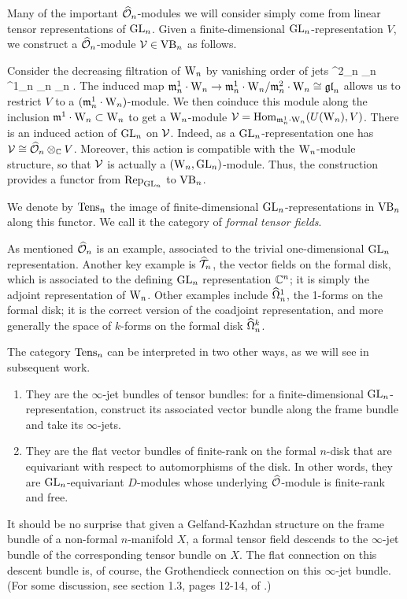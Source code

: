 Many of the important $\widehat{\mathcal O}_n$-modules we will consider simply come from linear tensor representations of ${\rm GL}_n$. 
Given a finite-dimensional ${\rm GL}_n$-representation $V$, we construct a $\widehat{\mathcal O}_n$-module $\mathcal{V} \in {\rm VB}_n$ as follows. 

Consider the decreasing filtration of ${{\rm W}_n}$ by vanishing order of jets 
\ben
\cdots \subset \fm^{2}_n _{n} \subset \fm^1_n _n _n .
\een 
The induced map ${\mathfrak m}_n^1 \cdot {{\rm W}_n} \to {\mathfrak m}_n^1 \cdot {{\rm W}_n} / {\mathfrak m}_n^2
\cdot {{\rm W}_n} \cong {\mathfrak{gl}}_n$ allows us to restrict $V$ to a $({\mathfrak m}_n^1 \cdot
{{\rm W}_n})$-module. 
We  then coinduce this module along the inclusion ${\mathfrak m}^1 \cdot {{\rm W}_n}
\subset {{\rm W}_n}$ to get a ${{\rm W}_n}$-module $\mathcal{V} = {\rm Hom}_{{\mathfrak m}_n^1 \cdot {{\rm W}_n}}(U({{\rm W}_n}),V)$. 
There is an induced action of ${\rm GL}_n$ on $\mathcal{V}$. Indeed, as a ${\rm GL}_n$-representation one has $\mathcal{V} \cong \widehat{\mathcal O}_n \otimes_{\mathbb C} V$.
Moreover, this action is compatible with the ${{\rm W}_n}$-module structure, so that $\mathcal{V}$ is actually a $({{\rm W}_n}, {\rm GL}_n)$-module. 
Thus, the construction provides a functor  from ${\rm Rep}_{{\rm GL}_n}$ to
${\rm VB}_n$.

\begin{dfn} 
We denote by ${\rm Tens}_n$ the image of finite-dimensional ${\rm GL}_n$-representations in ${\rm VB}_n$ along this functor. 
We call it the category of {\em formal tensor fields}.
\end{dfn}

As mentioned $\widehat{\mathcal O}_n$ is an example, associated to the trivial one-dimensional ${\rm GL}_n$ representation.
Another key example is $\widehat{\mathcal T}_n$, the vector fields on the formal disk, which is associated to the defining ${\rm GL}_n$ representation $\mathbb C^n$; 
it is simply the adjoint representation of ${{\rm W}_n}$.
Other examples include $\widehat{\Omega}^1_n$, the 1-forms on the formal disk; it
is the correct version of the coadjoint representation, and more
generally the space of $k$-forms on the formal disk $\widehat{\Omega}^k_n$. 

The category ${\rm Tens}_n$ can be interpreted in two other ways, as we will see in subsequent work.
\begin{enumerate}
\item They are the $\infty$-jet bundles of tensor bundles: for a finite-dimensional ${\rm GL}_n$-representation, 
construct its associated vector bundle along the frame bundle and take its $\infty$-jets.
\item They are the flat vector bundles of finite-rank on the formal $n$-disk that are equivariant with respect to automorphisms of the disk. 
In other words, they are ${\rm GL}_n$-equivariant $D$-modules whose underlying $\widehat{\mathcal O}$-module is finite-rank and free.
\end{enumerate}
It should be no surprise that given a Gelfand-Kazhdan structure on the frame bundle of a non-formal $n$-manifold $X$, 
a formal tensor field descends to the $\infty$-jet bundle of the corresponding tensor bundle on $X$. 
The flat connection on this descent bundle is, of course, the Grothendieck connection on this $\infty$-jet bundle. 
(For some discussion, see section 1.3, pages 12-14, of \cite{Fuks}.)


